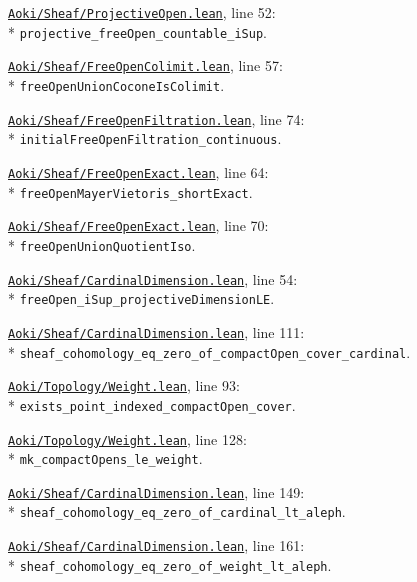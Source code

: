 \begin{leansources}
\item \href{../../../lean/Aoki/Sheaf/ProjectiveOpen.lean}{\nolinkurl{Aoki/Sheaf/ProjectiveOpen.lean}}, line 52:\\*
\nolinkurl{projective_freeOpen_countable_iSup}.
\item \href{../../../lean/Aoki/Sheaf/FreeOpenColimit.lean}{\nolinkurl{Aoki/Sheaf/FreeOpenColimit.lean}}, line 57:\\*
\nolinkurl{freeOpenUnionCoconeIsColimit}.
\item \href{../../../lean/Aoki/Sheaf/FreeOpenFiltration.lean}{\nolinkurl{Aoki/Sheaf/FreeOpenFiltration.lean}}, line 74:\\*
\nolinkurl{initialFreeOpenFiltration_continuous}.
\item \href{../../../lean/Aoki/Sheaf/FreeOpenExact.lean}{\nolinkurl{Aoki/Sheaf/FreeOpenExact.lean}}, line 64:\\*
\nolinkurl{freeOpenMayerVietoris_shortExact}.
\item \href{../../../lean/Aoki/Sheaf/FreeOpenExact.lean}{\nolinkurl{Aoki/Sheaf/FreeOpenExact.lean}}, line 70:\\*
\nolinkurl{freeOpenUnionQuotientIso}.
\item \href{../../../lean/Aoki/Sheaf/CardinalDimension.lean}{\nolinkurl{Aoki/Sheaf/CardinalDimension.lean}}, line 54:\\*
\nolinkurl{freeOpen_iSup_projectiveDimensionLE}.
\item \href{../../../lean/Aoki/Sheaf/CardinalDimension.lean}{\nolinkurl{Aoki/Sheaf/CardinalDimension.lean}}, line 111:\\*
\nolinkurl{sheaf_cohomology_eq_zero_of_compactOpen_cover_cardinal}.
\end{leansources}

\begin{leansources}
\item \href{../../../lean/Aoki/Topology/Weight.lean}{\nolinkurl{Aoki/Topology/Weight.lean}}, line 93:\\*
\nolinkurl{exists_point_indexed_compactOpen_cover}.
\item \href{../../../lean/Aoki/Topology/Weight.lean}{\nolinkurl{Aoki/Topology/Weight.lean}}, line 128:\\*
\nolinkurl{mk_compactOpens_le_weight}.
\item \href{../../../lean/Aoki/Sheaf/CardinalDimension.lean}{\nolinkurl{Aoki/Sheaf/CardinalDimension.lean}}, line 149:\\*
\nolinkurl{sheaf_cohomology_eq_zero_of_cardinal_lt_aleph}.
\item \href{../../../lean/Aoki/Sheaf/CardinalDimension.lean}{\nolinkurl{Aoki/Sheaf/CardinalDimension.lean}}, line 161:\\*
\nolinkurl{sheaf_cohomology_eq_zero_of_weight_lt_aleph}.
\end{leansources}
